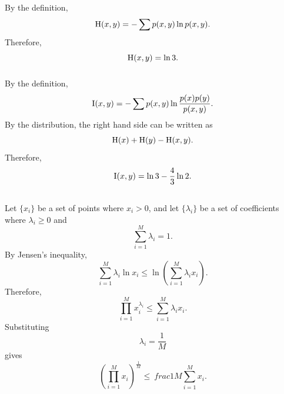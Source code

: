 \subsubsection{}
By the definition,
%
\begin{equation}
{\rm H}(x, y) 
= 
- 
\sum 
p(x, y) 
\ln p(x, y).
\end{equation}
%
Therefore,
%
\begin{equation}
{\rm H}(x, y) 
= 
\ln 3.
\end{equation}
%


\subsubsection{}
By the definition,
%
\begin{equation}
{\rm I}(x, y) 
= 
- 
\sum p(x, y) 
\ln \frac{p(x) p(y)}{p(x, y)}.
\end{equation}
%
By the distribution, the right hand side can be written as
%
\begin{equation}
{\rm H}(x) 
+ 
{\rm H}(y) 
- 
{\rm H}(x, y).
\end{equation}
%
Therefore,
%
\begin{equation}
{\rm I}(x, y) 
= 
\ln 3
- 
\frac{4}{3} 
\ln 2.
\end{equation}
%


\subsection{}
\label{1.40}
Let $\{ x_i \}$ be a set of points where $x_i > 0$, and let $\{ \lambda_i \}$ be a set of coefficients where $\lambda_i \geq 0$ and 
%
\begin{equation}
\sum_{i = 1}^{M} 
\lambda_i 
= 
1.
\end{equation}
%
By Jensen's inequality,
%
\begin{equation}
\sum_{i = 1}^{M} 
\lambda_i 
\ln x_i 
\leq 
\ln 
\left( 
	\sum_{i = 1}^{M} 
	\lambda_i 
	x_i 
\right).
\end{equation}
%
Therefore,
%
\begin{equation}
\prod_{i = 1}^{M} 
x_i ^ {\lambda_i} 
\leq 
\sum_{i = 1}^{M} 
\lambda_i 
x_i.
\end{equation}
%
Substituting
%
\begin{equation}
\lambda_i 
= 
\frac{1}{M}
\end{equation}
%
gives
%
\begin{equation}
\left( 
	\prod_{i = 1}^{M} 
	x_i 
\right) ^ \frac{1}{M} 
\leq \
frac{1}{M} 
\sum_{i = 1}^{M} 
x_i.
\end{equation}
%


